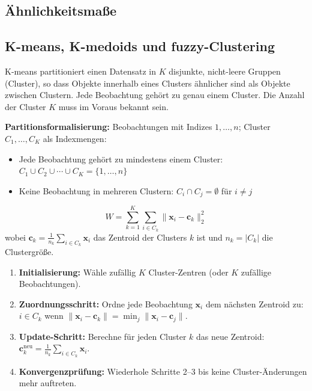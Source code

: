 \subsection{Ähnlichkeitsmaße}
\newpage



\subsection{K-means, K-medoids und fuzzy-Clustering}

K-means partitioniert einen Datensatz in $K$ disjunkte, nicht-leere Gruppen (Cluster), so dass Objekte innerhalb eines Clusters ähnlicher sind als Objekte zwischen Clustern. Jede Beobachtung gehört zu genau einem Cluster. Die Anzahl der Cluster $K$ muss im Voraus bekannt sein.

\textbf{Partitionsformalisierung:} Beobachtungen mit Indizes $1, \ldots, n$; Cluster $C_1, \ldots, C_K$ als Indexmengen:
\begin{itemize}[leftmargin=1.5em]
    \item Jede Beobachtung gehört zu mindestens einem Cluster: $C_1 \cup C_2 \cup \cdots \cup C_K = \{1, \ldots, n\}$
    \item Keine Beobachtung in mehreren Clustern: $C_i \cap C_j = \emptyset$ für $i \neq j$
\end{itemize}

 $$W = \sum_{k=1}^{K} \sum_{i \in C_k} \|\mathbf{x}_i - \mathbf{c}_k\|_2^2$$ wobei $\mathbf{c}_k = \frac{1}{n_k} \sum_{i \in C_k} \mathbf{x}_i$ das Zentroid der Clusters $k$ ist und $n_k = |C_k|$ die Clustergröße.

\begin{enumerate}[leftmargin=1.5em]
    \item \textbf{Initialisierung:} Wähle zufällig $K$ Cluster-Zentren (oder $K$ zufällige Beobachtungen).
    \item \textbf{Zuordnungsschritt:} Ordne jede Beobachtung $\mathbf{x}_i$ dem nächsten Zentroid zu: $i \in C_k$ wenn $\|\mathbf{x}_i - \mathbf{c}_k\| = \min_j \|\mathbf{x}_i - \mathbf{c}_j\|$.
    \item \textbf{Update-Schritt:} Berechne für jeden Cluster $k$ das neue Zentroid: $\mathbf{c}_k^{\text{neu}} = \frac{1}{n_k} \sum_{i \in C_k} \mathbf{x}_i$.
    \item \textbf{Konvergenzprüfung:} Wiederhole Schritte 2--3 bis keine Cluster-Änderungen mehr auftreten.
\end{enumerate}

